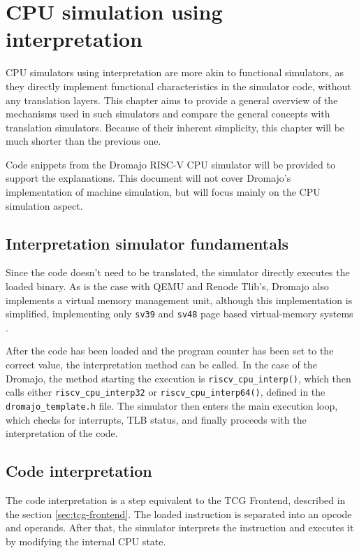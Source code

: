 
\chapter{CPU simulation using interpretation}

CPU simulators using interpretation are more akin to functional simulators, as they directly implement
functional characteristics in the simulator code, without any translation layers. This chapter aims to provide a
general overview of the mechanisms used in such simulators and compare the general concepts with translation
simulators.
Because of their inherent simplicity, this chapter will be much shorter than the previous one.

Code snippets from the Dromajo RISC-V CPU simulator will be provided to support the explanations. This document will not
cover Dromajo's implementation of machine simulation, but will focus mainly on the CPU simulation aspect.

\section*{Interpretation simulator fundamentals}

Since the code doesn't need to be translated, the simulator directly executes the loaded binary. As is the case with
QEMU and Renode Tlib's, Dromajo also implements a virtual memory management unit, although this implementation is
simplified, implementing only \texttt{sv39} and \texttt{sv48} page based virtual-memory systems \cite{RISC-PRIV}. %

After the code has been loaded and the program counter has been set to the correct value, the interpretation method
can be called. In the case of the Dromajo, the method starting the execution is \texttt{riscv\_cpu\_interp()}, which
then calls either \texttt{riscv\_cpu\_interp32} or \texttt{riscv\_cpu\_interp64()}, defined in the \texttt{dromajo\_template.h} file. The simulator then
enters the main execution loop, which checks for interrupts, TLB status, and finally proceeds with the interpretation of the code.

\section{Code interpretation}

The code interpretation is a step equivalent to the TCG Frontend, described in the section \ref{sec:tcg-frontend}.
The loaded instruction is separated into an opcode and operands. After that, the simulator interprets the instruction
and executes it by modifying the internal CPU state.

